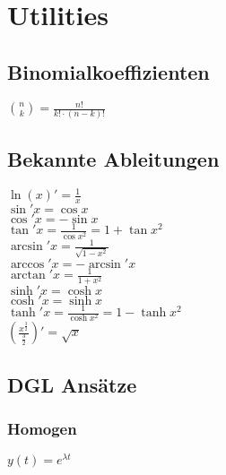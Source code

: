 \section{Utilities}
    \subsection{Binomialkoeffizienten}
        $\binom{n}{k} = \frac{n!}{k!\cdot(n-k)!}$
    \subsection{Bekannte Ableitungen}
        $\ln(x)' = \frac{1}{x} $ \\
        $\sin'{x} = \cos{x}$ \\
        $\cos'{x} = -\sin{x}$ \\
        $\tan'{x}=\frac{1}{\cos{x}^{2}} = 1 + \tan{x}^{2}$ \\
        $\arcsin'{x} = \frac{1}{\sqrt{1-x^{2}}}$ \\
        $\arccos'{x} = -\arcsin'{x}$ \\
        $\arctan'{x} = \frac{1}{1+x^{2}}$ \\
        $\sinh'{x} = \cosh{x}$ \\
        $\cosh'{x} = \sinh{x}$ \\
        $\tanh'{x} = \frac{1}{\cosh{x}^{2}} = 1 - \tanh{x}^{2}$ \\
        $\left(\frac{x^{\frac{3}{2}}}{\frac{3}{2}}\right)' = \sqrt{x}$
    \subsection{DGL Ansätze}
        \subsubsection{Homogen}
            $y(t) = e^{\lambda t}$
